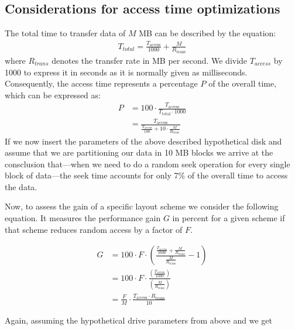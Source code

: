 
\subsection{Considerations for access time optimizations}

The total time to transfer data of $M$ MB can
be described by the equation:
\begin{align*}
  T_{total} =  \frac{T_{\text{access}}}{1000} +  \frac{M}{R_{\text{trans}}}
\end{align*}
where $R_{trans}$ denotes the transfer rate in MB per second. 
We divide $T_{access}$  by 1000 to express it in seconds as it is
normally given as milliseconds.
Consequently, the access time represents a percentage $P$ of the overall time,
which can be expressed as:
\begin{align*}
P &= 100 \cdot \frac{T_{\text{access}}}{T_{\text{total}} \cdot 1000}
\\&=  \frac{T_{\text{access}}} {\frac{T_{\text{access}}}{100} +  10 \cdot \frac{M}{R_{\text{trans}}}}
\end{align*}
If we now insert the parameters of the above described hypothetical
disk and assume that we are partitioning our data in 10 MB blocks we
arrive at the consclusion that---when we need to do a random seek
operation for every single block of data---the seek time accounts for
only 7\% of the overall time to access the data.

Now, to assess the gain of a specific layout scheme we consider the following 
equation. It measures the performance gain $G$ in percent for a given scheme if that scheme reduces 
random access by a factor of $F$.

\begin{align*}
G  &= 100 \cdot F \cdot \left( \frac{ \frac{T_{\text{access}}}{1000} + \frac{M}{R_{\text{trans}}} }{\frac{M}{R_{\text{trans}}}}- 1\right)
\\ &= 100 \cdot F \cdot \frac{ \left(\frac{ T_{\text{access}} } {1000}\right)}   { \left(\frac{M}{R_{\text{trans}}}\right)}
\\ &=  \frac{F}{M} \cdot \frac{T_{\text{access}} \cdot {R_{\text{trans}}}  }   { 10 }
\end{align*}

Again, assuming the hypothetical drive parameters from above and we get

